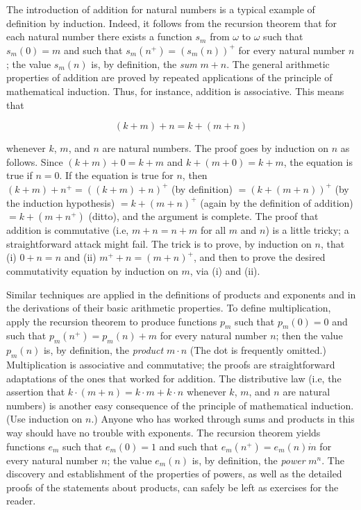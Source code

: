 
The introduction of addition for natural numbers is a typical example of definition by induction. Indeed, it follows from the recursion theorem that for each natural number there exists a function $s_{m}$ from $\omega$ to $\omega$ such that $s_{m}(0) = m$ and such that $s_{m}(n^{+}) = (s_{m}(n))^{+}$ for every natural number $n$; the value $s_{m}(n)$ is, by definition, the \textit{sum} $m + n$. The general arithmetic properties of addition are proved by repeated applications of the principle of mathematical induction. Thus, for instance, addition is associative. This means that 

\begin{equation*}
(k + m) + n = k + (m + n) 
\end{equation*}

whenever $k$, $m$, and $n$ are natural numbers. The proof goes by induction on $n$ as follows. Since $(k + m) + 0 = k + m$ and $k + (m + 0) = k + m$, the equation is true if $n = 0$. If the equation is true for $n$, then $(k + m) + n^{+} = ((k+ m) + n)^{+}$ (by definition) $ = (k + (m + n))^{+}$ (by the induction hypothesis) $ = k + (m + n)^{+}$ (again by the definition of addition) $ = k + (m + n^{+})$ (ditto), and the argument is complete. The proof that addition is commutative (i.e, $m + n = n+ m$ for all $m$ and $n$) is a little tricky; a straightforward attack might fail. The trick is to prove, by induction on $n$, that (i) $0 + n = n$ and (ii) $m^{+} + n =  (m + n)^{+}$, and then to prove the desired commutativity equation by induction on $m$, via (i) and (ii). 

Similar techniques are applied in the definitions of products and exponents and in the derivations of their basic arithmetic properties. To define multiplication, apply the recursion theorem to produce functions $p_{m}$ such that $p_{m}(0) = 0$ and such that $p_{m}(n^{+}) = p_{m}(n) + m$ for every natural number $n$; then the value $p_{m}(n)$ is, by definition, the \textit{product} $m \cdot n$ (The dot is frequently omitted.) Multiplication is associative and commutative; the proofs are straightforward adaptations of the ones that worked for addition. The distributive law (i.e, the assertion that $k \cdot (m + n)  = k \cdot m + k \cdot n$ whenever $k$, $m$, and $n$ are natural numbers) is another easy consequence of the principle of mathematical induction. (Use induction on $n$.) Anyone who has worked through sums and products in this way should have no trouble with exponents. The recursion theorem yields functions $e_{m}$ such that $e_{m}(0) = 1$ and such that $e_{m}(n^{+}) = e_{m}(n) \dot m$ for every natural number $n$; the value $e_{m}(n)$ is, by definition, the \textit{power} $m^{n}$. The discovery and establishment of the properties of powers, as well as the detailed proofs of the statements about products, can safely be left as exercises for the reader.

